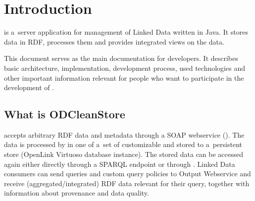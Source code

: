 
\newcommand{\version}{0.3.6}
\newcommand{\documentname}{\refprogrammersguide}






\renewcommand{\contentsname}{Contents}
\tableofcontents
\bigskip

\newpage







\chapter{Introduction}
\odcs is a~server application for management of Linked Data written in Java. It stores data in RDF, processes them and provides integrated views on the data.

This document serves as the main documentation for developers. It describes basic architecture, implementation, development process, used technologies and other important information relevant for people who want to participate in the development of \odcs.

\section{What is ODCleanStore}
\odcs accepts arbitrary RDF data and metadata through a SOAP webservice (). The data is processed by  in one of a~set of customizable  and stored to a~persistent store (OpenLink Virtuoso database instance). The stored data can be accessed again either  directly through a SPARQL endpoint or through . Linked Data consumers can send queries and custom query policies to Output Webservice and receive (aggregated/integrated) RDF data relevant for their query, together with information about provenance and data quality. 

